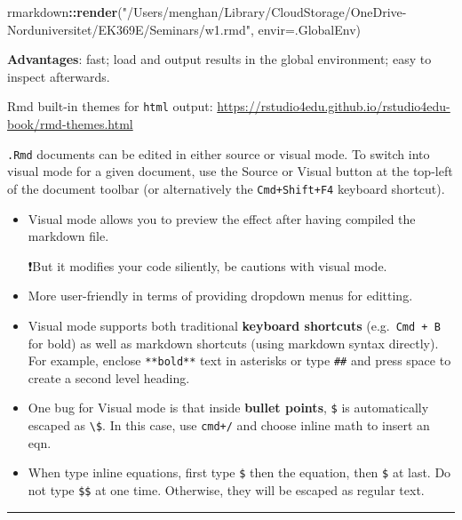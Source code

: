 \documentclass[
]{book}
\newenvironment{Shaded}{\begin{snugshade}}{\end{snugshade}}
\newcommand{\AttributeTok}[1]{\textcolor[rgb]{0.13,0.29,0.53}{#1}}
\newcommand{\FunctionTok}[1]{\textcolor[rgb]{0.13,0.29,0.53}{\textbf{#1}}}
\newcommand{\NormalTok}[1]{#1}
\newcommand{\SpecialCharTok}[1]{\textcolor[rgb]{0.81,0.36,0.00}{\textbf{#1}}}
\newcommand{\StringTok}[1]{\textcolor[rgb]{0.31,0.60,0.02}{#1}}
\theoremstyle{definition}
\theoremstyle{definition}
\theoremstyle{definition}
\theoremstyle{definition}
\theoremstyle{remark}
\begin{document}
\begin{Shaded}
\begin{Highlighting}[]
\NormalTok{rmarkdown}\SpecialCharTok{::}\FunctionTok{render}\NormalTok{(}\StringTok{"/Users/menghan/Library/CloudStorage/OneDrive{-}Norduniversitet/EK369E/Seminars/w1.rmd"}\NormalTok{, }\AttributeTok{envir=}\NormalTok{.GlobalEnv)}
\end{Highlighting}
\end{Shaded}

\textbf{Advantages}: fast; load and output results in the global environment; easy to inspect afterwards.

Rmd built-in themes for \texttt{html} output: \url{https://rstudio4edu.github.io/rstudio4edu-book/rmd-themes.html}

\texttt{.Rmd} documents can be edited in either source or visual mode. To switch into visual mode for a given document, use the Source or Visual button at the top-left of the document toolbar (or alternatively the \texttt{Cmd+Shift+F4} keyboard shortcut).

\begin{itemize}
\item
  Visual mode allows you to preview the effect after having compiled the markdown file.

  ❗️But it modifies your code siliently, be cautions with visual mode.
\item
  More user-friendly in terms of providing dropdown menus for editting.
\item
  Visual mode supports both traditional \textbf{keyboard shortcuts} (e.g.~\texttt{Cmd\ +\ B} for bold) as well as markdown shortcuts (using markdown syntax directly). For example, enclose \texttt{**bold**} text in asterisks or type \texttt{\#\#} and press space to create a second level heading.
\item
  One bug for Visual mode is that inside \textbf{bullet points}, \texttt{\$} is automatically escaped as \texttt{\textbackslash{}\$}. In this case, use {\texttt{cmd+/}} and choose {inline math} to insert an eqn.
\item
  When type inline equations, first type \texttt{\$} then the equation, then \texttt{\$} at last. Do not type \texttt{\$\$} at one time. Otherwise, they will be escaped as regular text.
\end{itemize}

\begin{center}\rule{0.5\linewidth}{0.5pt}\end{center}
\end{document}
